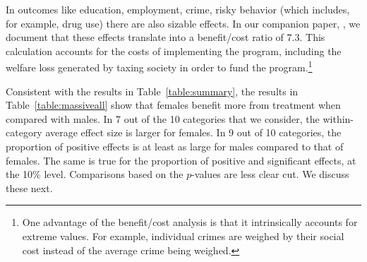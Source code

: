 In outcomes like education, employment, crime, risky behavior (which includes, for example, drug use) there are also sizable effects. In our companion paper, \citet{Garcia_Heckman_Leaf_etal_2017_Comp_CBA_Unpublished}, we document that these effects translate into a benefit/cost ratio of $7.3$. This calculation accounts for the costs of implementing the program, including the welfare loss generated by taxing society in order to fund the program.\footnote{One advantage of the benefit/cost analysis is that it intrinsically accounts for extreme values. For example, individual crimes are weighed by their social cost instead of the average crime being weighed.}

Consistent with the results in Table~\ref{table:summary}, the results in Table~\ref{table:massiveall} show that females benefit more from treatment when compared with males. In 7 out of the 10 categories that we consider, the within-category average effect size is larger for females. In 9 out of 10 categories, the proportion of positive effects is at least as large for males compared to that of females. The same is true for the proportion of positive and significant effects, at the 10\% level. Comparisons based on the \citet{Rosenbaum_2005_Distribution_JRSS} $p$-values are less clear cut. We discuss these next.


